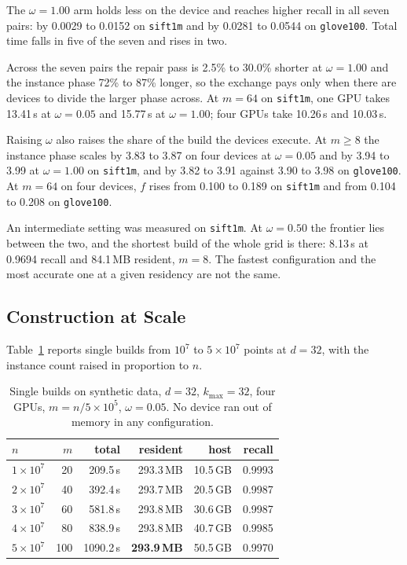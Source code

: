\documentclass{ieeeaccess}
\newcommand{\kmax}{k_{\max}}
\begin{document}
The $\omega = 1.00$ arm holds less on the device and reaches higher recall in
all seven pairs: by 0.0029 to 0.0152 on \texttt{sift1m} and by 0.0281 to 0.0544
on \texttt{glove100}. Total time falls in five of the seven and rises in two.

Across the seven pairs the repair pass is 2.5\% to 30.0\% shorter at
$\omega = 1.00$ and the instance phase 72\% to 87\% longer, so the exchange pays
only when there are devices to divide the larger phase across. At $m = 64$ on
\texttt{sift1m}, one GPU takes 13.41\,s at $\omega = 0.05$ and 15.77\,s at
$\omega = 1.00$; four GPUs take 10.26\,s and 10.03\,s.

Raising $\omega$ also raises the share of the build the devices execute. At
$m \ge 8$ the instance phase scales by 3.83 to 3.87 on four devices at
$\omega = 0.05$ and by 3.94 to 3.99 at $\omega = 1.00$ on \texttt{sift1m}, and by
3.82 to 3.91 against 3.90 to 3.98 on \texttt{glove100}. At $m = 64$ on four
devices, $f$ rises from 0.100 to 0.189 on \texttt{sift1m} and from 0.104 to
0.208 on \texttt{glove100}.

An intermediate setting was measured on \texttt{sift1m}. At $\omega = 0.50$ the
frontier lies between the two, and the shortest build of the whole grid is there:
8.13\,s at 0.9694 recall and 84.1\,MB resident, $m = 8$. The fastest
configuration and the most accurate one at a given residency are not the same.

\subsection{Construction at Scale}
\label{sec:scale}

Table~\ref{tab:scale} reports single builds from $10^7$ to $5\times10^7$ points
at $d = 32$, with the instance count raised in proportion to $n$.

\begin{table}[!t]
\caption{Single builds on synthetic data, $d = 32$, $\kmax = 32$, four GPUs,
$m = n / 5\times10^5$, $\omega = 0.05$. No device ran out of memory in any
configuration.}
\label{tab:scale}
\centering
\footnotesize
\begin{tabular}{@{}lrrrrr@{}}
\toprule
$n$ & $m$ & total & resident & host & recall \\
\midrule
$1\times10^7$ & 20  & 209.5\,s  & 293.3\,MB & 10.5\,GB & 0.9993 \\
$2\times10^7$ & 40  & 392.4\,s  & 293.7\,MB & 20.5\,GB & 0.9987 \\
$3\times10^7$ & 60  & 581.8\,s  & 293.8\,MB & 30.6\,GB & 0.9987 \\
$4\times10^7$ & 80  & 838.9\,s  & 293.8\,MB & 40.7\,GB & 0.9985 \\
$5\times10^7$ & 100 & 1090.2\,s & \textbf{293.9\,MB} & 50.5\,GB & 0.9970 \\
\bottomrule
\end{tabular}
\end{table}
\end{document}
